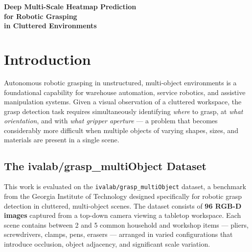\documentclass[12pt, a4paper]{article}
\begin{document}
\begin{titlepage}
    \centering
    \vspace*{\fill}
    {\Huge\bfseries Deep Multi-Scale Heatmap Prediction\\[0.6em]
     for Robotic Grasping\\[0.6em]
     in Cluttered Environments}
    \vspace*{\fill}
\end{titlepage}

\setcounter{page}{2}

\section{Introduction}

Autonomous robotic grasping in unstructured, multi-object environments is a foundational capability for warehouse automation, service robotics, and assistive manipulation systems. Given a visual observation of a cluttered workspace, the grasp detection task requires simultaneously identifying \textit{where} to grasp, at \textit{what orientation}, and with \textit{what gripper aperture} — a problem that becomes considerably more difficult when multiple objects of varying shapes, sizes, and materials are present in a single scene.

\subsection{The ivalab/grasp\_multiObject Dataset}

This work is evaluated on the \texttt{ivalab/grasp\_multiObject} dataset, a benchmark from the Georgia Institute of Technology designed specifically for robotic grasp detection in cluttered, multi-object scenes. The dataset consists of \textbf{96 RGB-D images} captured from a top-down camera viewing a tabletop workspace. Each scene contains between 2 and 5 common household and workshop items — pliers, screwdrivers, clamps, pens, erasers — arranged in varied configurations that introduce occlusion, object adjacency, and significant scale variation.
\end{document}

